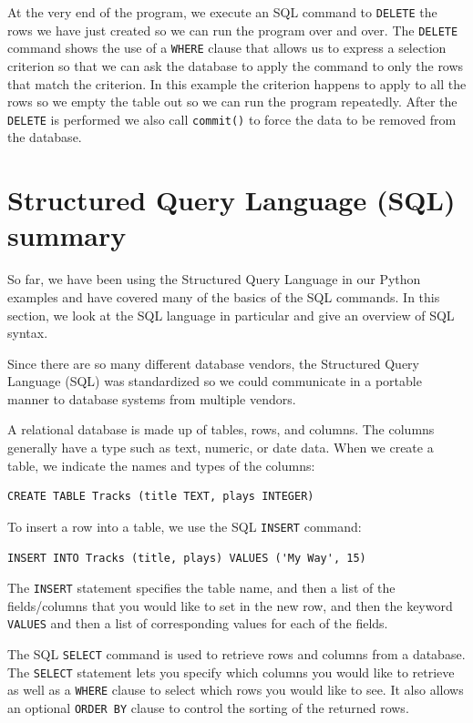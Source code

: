 \documentclass[11pt]{book}
\begin{document}
At the very end of the program, we execute an SQL command to {\tt DELETE} 
the rows we have just created so we can run the program over and over.
The {\tt DELETE} command shows the use of a {\tt WHERE} clause that
allows us to express a selection criterion so that we can ask the database
to apply the command to only the rows that match the criterion.  In this example
the criterion happens to apply to all the rows so we empty the table
out so we can run the program repeatedly.  After the {\tt DELETE} is performed
we also call {\tt commit()} to force the data to be removed from the database.

\section{Structured Query Language (SQL) summary}

So far, we have been using the Structured Query Language in our Python
examples and have covered many of the basics of the SQL commands.
In this section, we look at the SQL language in particular
and give an overview of SQL syntax.

Since there are so many different database vendors, the Structured Query
Language (SQL) was standardized so we could communicate in a portable
manner to database systems from multiple vendors.

A relational database is made up of tables, rows, and columns.  The columns
generally have a type such as text, numeric, or date data.  When we create
a table, we indicate the names and types of the columns:

\beforeverb
\begin{verbatim}
CREATE TABLE Tracks (title TEXT, plays INTEGER)
\end{verbatim}
\afterverb
%
To insert a row into a table, we use the SQL {\tt INSERT} command:

\beforeverb
\begin{verbatim}
INSERT INTO Tracks (title, plays) VALUES ('My Way', 15)
\end{verbatim}
\afterverb
%
The {\tt INSERT} statement specifies the table name, and then a list of
the fields/columns that you would like to set in the new row, and then 
the keyword {\tt VALUES} and then a list of corresponding values 
for each of the fields.

The SQL {\tt SELECT} command is used to retrieve rows and columns from a database.
The {\tt SELECT} statement lets you specify which columns you would
like to retrieve as well as a {\tt WHERE} clause to select which 
rows you would like to see.  It also allows an optional 
{\tt ORDER BY} clause to control the sorting of the returned rows.
\end{document}
